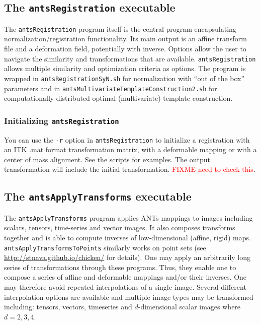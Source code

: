 \documentclass{InsightArticle}
\begin{document}
\subsection{The \texttt{antsRegistration} executable}
The \texttt{antsRegistration} program itself is the central program encapsulating
normalization/registration functionality.  Its main output is an
affine transform file and a deformation field, potentially with
inverse.  Options allow the user to navigate the similarity
and transformations that are available.  \texttt{antsRegistration} allows multiple
similarity and optimization criteria as options.  The program is
wrapped in \texttt{antsRegistrationSyN.sh} for normalization with ``out of the box''
parameters and in \texttt{antsMultivariateTemplateConstruction2.sh} for 
computationally distributed optimal (multivariate) template construction.

\subsubsection{Initializing \texttt{antsRegistration}}
You can use the  \texttt{-r} option in \texttt{antsRegistration} to
initialize a registration with an ITK .mat format transformation matrix, with a
deformable mapping or with a center of mass alignment.  See the
scripts for examples.  The output transformation will include the
initial transformation. \textcolor{red}{FIXME need to check this}.


\subsection{The \texttt{antsApplyTransforms} executable}
The \texttt{antsApplyTransforms} program applies ANTs mappings to
images including scalars, tensors, time-series and vector images.  
It also composes transforms together and is able to compute
inverses of low-dimensional (affine, rigid) maps.  
\texttt{antsApplyTransformsToPoints} similarly works on point sets (see
\href{http://stnava.github.io/chicken/}{http://stnava.github.io/chicken/} for details).  One may apply an 
arbitrarily long series of transformations through these programs.  Thus, they enable one 
to compose a series of affine and deformable mappings and/or their
inverses.  One may therefore avoid repeated interpolations of a single
image.  Several different
interpolation options are available and multiple image types may be
transformed including:   tensors, vectors, timeseries and
$d$-dimensional scalar images where $d=2, 3, 4$.
\end{document}
